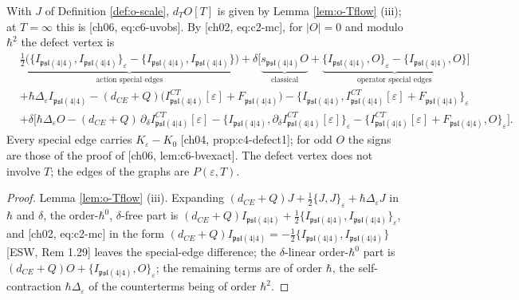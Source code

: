 \begin{proposition}
\label{prop:o-uv}
With $J$ of Definition \ref{def:o-scale}, $d_TO[T]$ is given by Lemma \ref{lem:o-Tflow} (iii); at $T=\infty$ this is [ch06, eq:c6-uvobs]. By [ch02, eq:c2-mc], for $|O|=0$ and modulo $\hbar^2$ the defect vertex is
\begin{equation}
\begin{aligned}
&\underbrace{\tfrac12\big(\{I_{\mathfrak{psl}(4|4)},I_{\mathfrak{psl}(4|4)}\}_\varepsilon-\{I_{\mathfrak{psl}(4|4)},I_{\mathfrak{psl}(4|4)}\}\big)}_{\text{action special edges}}+\delta\Big[\underbrace{s_{\mathfrak{psl}(4|4)}O}_{\text{classical}}+\underbrace{\{I_{\mathfrak{psl}(4|4)},O\}_\varepsilon-\{I_{\mathfrak{psl}(4|4)},O\}}_{\text{operator special edges}}\Big]\\
&+\hbar\Delta_\varepsilon I_{\mathfrak{psl}(4|4)}-(d_{CE}+Q)\big(I^{CT}_{\mathfrak{psl}(4|4)}[\varepsilon]+F_{\mathfrak{psl}(4|4)}\big)-\big\{I_{\mathfrak{psl}(4|4)},I^{CT}_{\mathfrak{psl}(4|4)}[\varepsilon]+F_{\mathfrak{psl}(4|4)}\big\}_\varepsilon\\
&+\delta\Big[\hbar\Delta_\varepsilon O-(d_{CE}+Q)\,\partial_\delta I^{CT}_{\mathfrak{psl}(4|4)}[\varepsilon]-\big\{I_{\mathfrak{psl}(4|4)},\partial_\delta I^{CT}_{\mathfrak{psl}(4|4)}[\varepsilon]\big\}_\varepsilon-\big\{I^{CT}_{\mathfrak{psl}(4|4)}[\varepsilon]+F_{\mathfrak{psl}(4|4)},O\big\}_\varepsilon\Big].
\end{aligned}
\label{eq:o-defect}
\end{equation}
Every special edge carries $K_\varepsilon-K_0$ [ch04, prop:c4-defect1]; for odd $O$ the signs are those of the proof of [ch06, lem:c6-bvexact]. The defect vertex does not involve $T$; the edges of the graphs are $P(\varepsilon,T)$.
\end{proposition}

\begin{proof}
Lemma \ref{lem:o-Tflow} (iii). Expanding $(d_{CE}+Q)J+\tfrac12\{J,J\}_\varepsilon+\hbar\Delta_\varepsilon J$ in $\hbar$ and $\delta$, the order-$\hbar^0$, $\delta$-free part is $(d_{CE}+Q)I_{\mathfrak{psl}(4|4)}+\tfrac12\{I_{\mathfrak{psl}(4|4)},I_{\mathfrak{psl}(4|4)}\}_\varepsilon$, and [ch02, eq:c2-mc] in the form $(d_{CE}+Q)I_{\mathfrak{psl}(4|4)}=-\tfrac12\{I_{\mathfrak{psl}(4|4)},I_{\mathfrak{psl}(4|4)}\}$ [ESW, Rem 1.29] leaves the special-edge difference; the $\delta$-linear order-$\hbar^0$ part is $(d_{CE}+Q)O+\{I_{\mathfrak{psl}(4|4)},O\}_\varepsilon$; the remaining terms are of order $\hbar$, the self-contraction $\hbar\Delta_\varepsilon$ of the counterterms being of order $\hbar^2$.
\end{proof}

